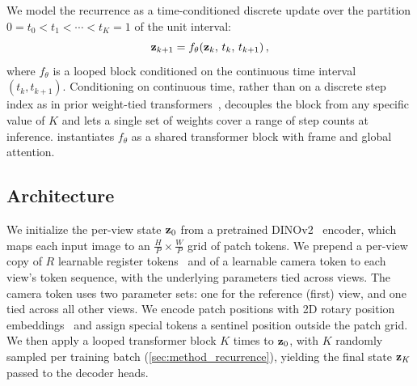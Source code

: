 We model the recurrence as a time-conditioned discrete update over the partition $0 = t_0 < t_1 < \cdots < t_K = 1$ of the unit interval:
\begin{equation}
    \mathbf{z}_{k+1} = f_\theta(\mathbf{z}_k,\, t_k,\, t_{k+1})\,,
\label{eq:discrete_recurrence}
\end{equation}
where $f_\theta$ is a looped block conditioned on the continuous time interval $(t_k, t_{k+1})$.
Conditioning on continuous time, rather than on a discrete step index as in prior weight-tied transformers~\citep{dehghani2019universal}, decouples the block from any specific value of $K$ and lets a single set of weights cover a range of step counts at inference.
 instantiates $f_\theta$ as a shared transformer block with frame and global attention.



\subsection{Architecture}
\label{sec:method_arch}

We initialize the per-view state $\mathbf{z}_0$ from a pretrained DINOv2~\citep{oquab2023dinov2} encoder, which maps each input image to an $\frac{H}{P} \times \frac{W}{P}$ grid of patch tokens.
We prepend a per-view copy of $R$ learnable register tokens~\citep{darcet2024vision} and of a learnable camera token to each view's token sequence, with the underlying parameters tied across views. The camera token uses two parameter sets: one for the reference (first) view, and one tied across all other views.
We encode patch positions with 2D rotary position embeddings~\citep{heo2024ropevit} and assign special tokens a sentinel position outside the patch grid.
We then apply a looped transformer block $K$ times to $\mathbf{z}_0$, with $K$ randomly sampled per training batch (\cref{sec:method_recurrence}), yielding the final state $\mathbf{z}_K$ passed to the decoder heads.

